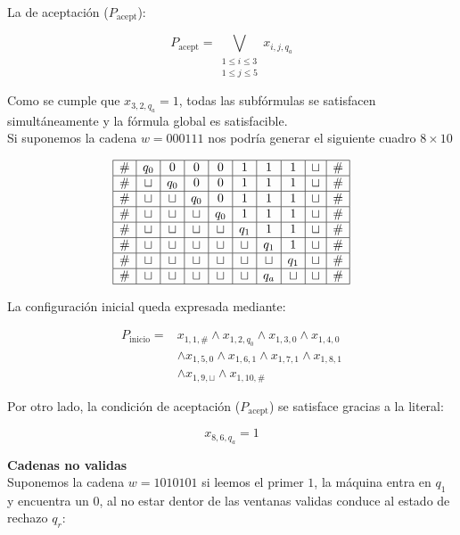 La de aceptación ($P_{\mathrm{acept}}$):

\[
P_{\mathrm{acept}} =
\bigvee_{\substack{1 \leq i \leq 3\\
1 \leq j \leq 5}}
x_{i,j,q_a}
\]

Como se cumple que $x_{3,2,q_a}=\text{1}$, todas las subfórmulas se satisfacen simultáneamente y la fórmula global
es satisfacible.\\

Si suponemos la cadena \textbf{$w=000111$} nos podría generar el siguiente cuadro $8 \times 10$ 

\[
\begin{array}{|c|c|c|c|c|c|c|c|c|c|}
\hline
\# & q_0 & 0 & 0 & 0 & 1 & 1 & 1 & \sqcup & \# \\
\hline
\# & \sqcup & q_0 & 0 & 0 & 1 & 1 & 1 & \sqcup & \# \\
\hline
\# & \sqcup & \sqcup & q_0 & 0 & 1 & 1 & 1 & \sqcup & \# \\
\hline
\# & \sqcup & \sqcup & \sqcup & q_0 & 1 & 1 & 1 & \sqcup & \# \\
\hline
\# & \sqcup & \sqcup & \sqcup & \sqcup & q_1 & 1 & 1 & \sqcup & \# \\
\hline
\# & \sqcup & \sqcup & \sqcup & \sqcup & \sqcup & q_1 & 1 & \sqcup & \# \\
\hline
\# & \sqcup & \sqcup & \sqcup & \sqcup & \sqcup & \sqcup & q_1 & \sqcup & \# \\
\hline
\# & \sqcup & \sqcup & \sqcup & \sqcup & \sqcup & q_a & \sqcup & \sqcup & \# \\
\hline
\end{array}
\]

La configuración inicial queda expresada mediante:

\[
\begin{aligned}
P_{\mathrm{inicio}} ={}&
x_{1,1,\#} \wedge x_{1,2,q_0}
\wedge x_{1,3,0} \wedge x_{1,4,0}\\
&\wedge x_{1,5,0} \wedge x_{1,6,1}
\wedge x_{1,7,1} \wedge x_{1,8,1}\\
&\wedge x_{1,9,\sqcup}
\wedge x_{1,10,\#}
\end{aligned}
\]

Por otro lado, la condición de aceptación
($P_{\mathrm{acept}}$) se satisface gracias a
la literal:

\[
x_{8,6,q_a}=\text{1}
\]

\textbf{Cadenas no validas}\\

Suponemos la cadena $w=1010101$ si leemos el primer $1$, la máquina entra en $q_1$ y encuentra un $0$, al no estar dentor de las ventanas validas conduce al estado de rechazo $q_r$:

